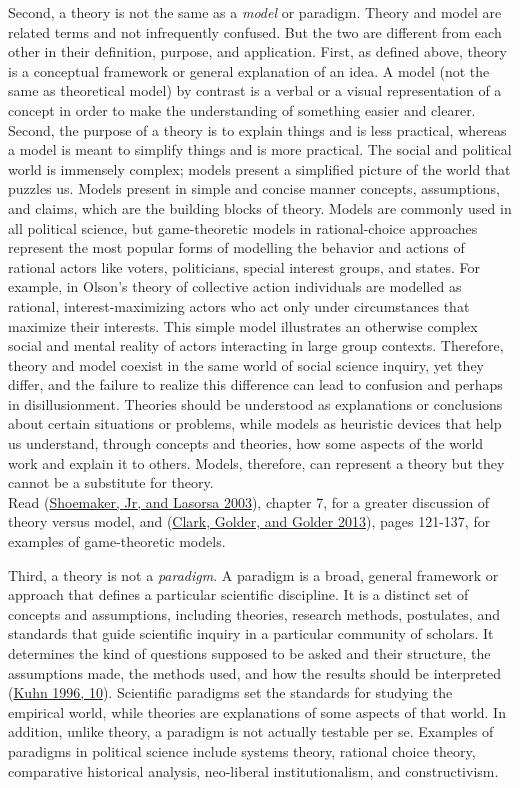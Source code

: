 \documentclass{book}
\begin{document}
Second, a theory is not the same as a \emph{model} or paradigm. Theory and
model are related terms and not infrequently confused. But the two are
different from each other in their definition, purpose, and application.
First, as defined above, theory is a conceptual framework or general
explanation of an idea. A model (not the same as theoretical model) by
contrast is a verbal or a visual representation of a concept in order to make
the understanding of something easier and clearer. Second, the purpose of a
theory is to explain things and is less practical, whereas a model is meant to
simplify things and is more practical. The social and political world is
immensely complex; models present a simplified picture of the world that
puzzles us. Models present in simple and concise manner concepts, assumptions,
and claims, which are the building blocks of theory. Models are commonly used
in all political science, but game-theoretic models in rational-choice
approaches represent the most popular forms of modelling the behavior and
actions of rational actors like voters, politicians, special interest groups,
and states. For example, in Olson's theory of collective action individuals
are modelled as rational, interest-maximizing actors who act only under
circumstances that maximize their interests. This simple model illustrates an
otherwise complex social and mental reality of actors interacting in large
group contexts. Therefore, theory and model coexist in the same world of
social science inquiry, yet they differ, and the failure to realize this
difference can lead to confusion and perhaps in disillusionment. Theories
should be understood as explanations or conclusions about certain situations
or problems, while models as heuristic devices that help us understand,
through concepts and theories, how some aspects of the world work and explain
it to others. Models, therefore, can represent a theory but they cannot be a
substitute for theory.\\
Read (\protect\hyperlink{ref-shoemakerHowBuildSocial2003}{Shoemaker, Jr, and
Lasorsa 2003}), chapter 7, for a greater discussion of theory versus model,
and (\protect\hyperlink{ref-clarkPrinciplesComparativePolitics2013}{Clark,
Golder, and Golder 2013}), pages 121-137, for examples of game-theoretic
models.

Third, a theory is not a \emph{paradigm}. A paradigm is a broad, general
framework or approach that defines a particular scientific discipline. It is a
distinct set of concepts and assumptions, including theories, research
methods, postulates, and standards that guide scientific inquiry in a
particular community of scholars. It determines the kind of questions supposed
to be asked and their structure, the assumptions made, the methods used, and
how the results should be interpreted
(\protect\hyperlink{ref-kuhnStructureScientificRevolutions1996}{Kuhn 1996,
10}). Scientific paradigms set the standards for studying the empirical world,
while theories are explanations of some aspects of that world. In addition,
unlike theory, a paradigm is not actually testable per se. Examples of
paradigms in political science include systems theory, rational choice theory,
comparative historical analysis, neo-liberal institutionalism, and
constructivism.
\end{document}
